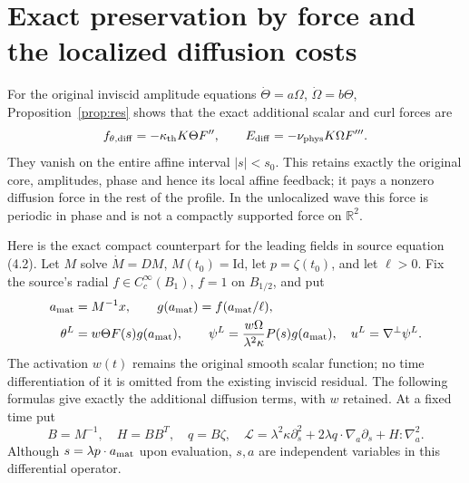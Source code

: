 \documentclass[11pt]{article}
\newcommand{\R}{\mathbb R}
\newcommand{\thd}{\kappa_{\rm th}}
\newcommand{\vis}{\nu_{\rm phys}}
\begin{document}
\section{Exact preservation by force and the localized diffusion costs}

For the original inviscid amplitude equations $\dot\Theta=a\Omega$,
$\dot\Omega=b\Theta$, Proposition~\ref{prop:res} shows that the exact
additional scalar and curl forces are
\begin{equation}\label{eq:repair}
 f_{\theta,\mathrm{diff}}=-\thd K\Theta F'',\qquad
 E_{\mathrm{diff}}=-\vis K\Omega F'''.
\end{equation}
They vanish on the entire affine interval $|s|<s_0$. This retains exactly
the original core, amplitudes, phase and hence its local affine feedback;
it pays a nonzero diffusion force in the rest of the profile. In the
unlocalized wave this force is periodic in phase and is not a compactly
supported force on $\R^2$.

Here is the exact compact counterpart for the leading fields in source
equation (4.2). Let $M$ solve $\dot M=DM$, $M(t_0)=\mathrm{Id}$, let
$p=\zeta(t_0)$, and let $\ell>0$. Fix the source's radial
$f\in C_c^\infty(B_1)$, $f=1$ on $B_{1/2}$, and put
\begin{align}\label{eq:localized}
 a_{\rm mat}&=M^{-1}x,\qquad g(a_{\rm mat})=f(a_{\rm mat}/\ell),\notag\\
 \theta^L&=w\Theta F(s)g(a_{\rm mat}),\qquad
 \psi^L=\frac{w\Omega}{\lambda^2\kappa}P(s)g(a_{\rm mat}),\quad
 u^L=\nabla^\perp\psi^L.
\end{align}
The activation $w(t)$ remains the original smooth scalar function; no
time differentiation of it is omitted from the existing inviscid
residual. The following formulas give exactly the additional diffusion
terms, with $w$ retained.
At a fixed time put
\begin{equation}\label{eq:L}
 B=M^{-1},\quad H=BB^T,\quad q=B\zeta,\quad
 \mathscr L=\lambda^2\kappa\partial_s^2+
            2\lambda q\cdot\nabla_a\partial_s+H:\nabla_a^2.
\end{equation}
Although $s=\lambda p\cdot a_{\rm mat}$ upon evaluation, $s,a$ are
independent variables in this differential operator.
\end{document}
